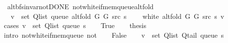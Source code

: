 \begin{isabellebody}
{\isafolddocument}%
%
\isadelimdocument
%
\endisadelimdocument
{}\isamarkupfalse%
\ {\isacharparenleft}{\kern0pt}\ alt{\isacharunderscore}{\kern0pt}bfs{\isacharunderscore}{\kern0pt}invar{\isacharunderscore}{\kern0pt}not{\isacharunderscore}{\kern0pt}DONE{\isacharparenright}{\kern0pt}\ not{\isacharunderscore}{\kern0pt}white{\isacharunderscore}{\kern0pt}if{\isacharunderscore}{\kern0pt}mem{\isacharunderscore}{\kern0pt}queue{\isacharunderscore}{\kern0pt}alt{\isacharunderscore}{\kern0pt}fold{\isacharcolon}{\kern0pt}\isanewline
\ \ \ {\isachardoublequoteopen}v\ {\isasymin}\ set\ {\isacharparenleft}{\kern0pt}Q{\isacharunderscore}{\kern0pt}list\ {\isacharparenleft}{\kern0pt}queue\ {\isacharparenleft}{\kern0pt}alt{\isacharunderscore}{\kern0pt}fold\ G{}\ G{}\ src\ s{\isacharparenright}{\kern0pt}{\isacharparenright}{\kern0pt}{\isacharparenright}{\kern0pt}{\isachardoublequoteclose}\isanewline
\ \ \ {\isachardoublequoteopen}{\isasymnot}\ white\ {\isacharparenleft}{\kern0pt}alt{\isacharunderscore}{\kern0pt}fold\ G{}\ G{}\ src\ s{\isacharparenright}{\kern0pt}\ v{\isachardoublequoteclose}\isanewline
%
\isadelimproof
%
\endisadelimproof
%
\isatagproof
{}\isamarkupfalse%
\ {\isacharparenleft}{\kern0pt}cases\ {\isachardoublequoteopen}v\ {\isasymin}\ set\ {\isacharparenleft}{\kern0pt}Q{\isacharunderscore}{\kern0pt}list\ {\isacharparenleft}{\kern0pt}queue\ s{\isacharparenright}{\kern0pt}{\isacharparenright}{\kern0pt}{\isachardoublequoteclose}{\isacharparenright}{\kern0pt}\isanewline
\ \ \isamarkupfalse%
\ True\isanewline
\ \ \isamarkupfalse%
\ {\isacharquery}{\kern0pt}thesis\isanewline
\ \ \ \ \isamarkupfalse%
\ {\isacharparenleft}{\kern0pt}intro\ not{\isacharunderscore}{\kern0pt}white{\isacharunderscore}{\kern0pt}if{\isacharunderscore}{\kern0pt}mem{\isacharunderscore}{\kern0pt}queue\ not{\isacharunderscore}{\kern0pt}{\isacharparenleft}{\kern0pt}{}{\isacharparenright}{\kern0pt}{\isacharparenright}{\kern0pt}\isanewline
{}\isamarkupfalse%
\isanewline
\ \ \isamarkupfalse%
\ False\isanewline
\ \ \isamarkupfalse%
\ {\isachardoublequoteopen}v\ {\isasymnotin}\ set\ {\isacharparenleft}{\kern0pt}Q{\isacharunderscore}{\kern0pt}list\ {\isacharparenleft}{\kern0pt}Q{\isacharunderscore}{\kern0pt}tail\ {\isacharparenleft}{\kern0pt}queue\ s{\isacharparenright}{\kern0pt}{\isacharparenright}{\kern0pt}{\isacharparenright}{\kern0pt}{\isachardoublequoteclose}\isanewline

\end{isabellebody}
